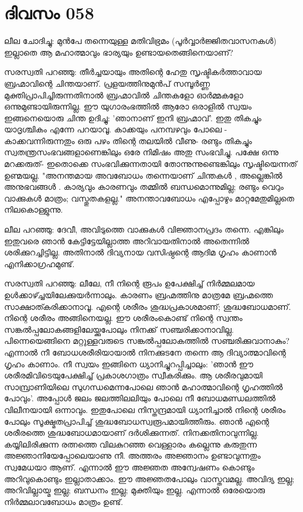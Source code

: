  
\section{ദിവസം 058}


ലീല ചോദിച്ചു: മുന്‍പേ തന്നെയുള്ള മതിവിഭ്രമം (പൂർവ്വാര്‍ജ്ജിതവാസനകൾ) ഇല്ലാതെ ആ മഹാത്മാവും ഭാര്യയും ഉണ്ടായതെങ്ങിനെയാണ്‌?

സരസ്വതി പറഞ്ഞു: തീര്‍ച്ചയായും അതിന്റെ ഹേതു സൃഷ്ടികര്‍ത്താവായ ബ്രഹ്മാവിന്റെ ചിന്തയാണ്‌. പ്രളയത്തിനുമുന്‍പ്‌ സമ്പൂര്‍ണ്ണ മുക്തിപ്രാപിച്ചിരുന്നതിനാല്‍ ബ്രഹ്മാവില്‍ ചിന്തകളോ ഓര്‍മ്മകളോ ഒന്നുമുണ്ടായിരുന്നില്ല. ഈ യുഗാരംഭത്തില്‍ ആരോ ഒരാളിൽ സ്വയം ഇങ്ങനെയൊരു ചിന്ത ഉദിച്ചു: 'ഞാനാണ്‌ ഇനി ബ്രഹ്മാവ്‌'. ഇതു തികച്ചും യാദൃശ്ചികം എന്നേ പറയാവൂ. കാക്കയും പനമ്പഴവും പോലെ - കാക്കവന്നിരുന്നതും ഒരു പഴം തിന്റെ തലയില്‍ വീണു- രണ്ടും തികച്ചും സ്വതന്ത്രസംഭവങ്ങളാണെങ്കിലും ഒരേ നിമിഷം അതു സംഭവിച്ചു. പക്ഷേ ഒന്നു മറക്കരുത്‌- ഇതൊക്കെ സംഭവിക്കുന്നതായി തോന്നുന്നുണ്ടെങ്കിലും സൃഷ്ടിയെന്നത്‌ ഉണ്മയല്ല. "അനന്തമായ അവബോധം തന്നെയാണ്‌ ചിന്തകള്‍ , അല്ലെങ്കില്‍ അനുഭവങ്ങള്‍ . കാര്യവും കാരണവും തമ്മില്‍ ബന്ധമൊന്നുമില്ല; രണ്ടും വെറും വാക്കുകള്‍ മാത്രം; വസ്തുതകളല്ല." അനന്താവബോധം എപ്പോഴും മാറ്റമേതുമില്ലതെ നിലകൊള്ളുന്നു.

ലീല പറഞ്ഞു: ദേവീ, അവിടുത്തെ വാക്കുകള്‍ വിജ്ഞാനപ്രദം തന്നെ. എങ്കിലും ഇതുവരെ ഞാന്‍ കേട്ടിട്ടേയില്ലാത്ത അറിവായതിനാല്‍ അതെന്നില്‍ ശരിക്കുറച്ചിട്ടില്ല. അതിനാല്‍ ദിവ്യനായ വസിഷ്ഠന്റെ ആദിമ ഗൃഹം കാണാന്‍ എനിക്കാഗ്രഹമുണ്ട്‌. 

സരസ്വതി പറഞ്ഞു: ലീലേ, നീ നിന്റെ രൂപം ഉപേക്ഷിച്ച്‌ നിര്‍മ്മലമായ ഉള്‍ക്കാഴ്ച്ചയിലേക്കുയര്‍ന്നാലും. കാരണം ബ്രഹ്മത്തിനു മാത്രമേ ബ്രഹ്മത്തെ സാക്ഷാത്കരിക്കാനാവൂ. എന്റെ ശരീരം ശുദ്ധപ്രകാശമാണ്‌; ശുദ്ധബോധമാണ്‌. നിന്റെ ശരീരം അങ്ങിനെയല്ല. ഈ ശരീരംകൊണ്ട്‌ നിന്റെ സ്വന്തം സങ്കല്‍പ്പലോകങ്ങളിലേയ്ക്കുപോലും നിനക്ക്‌ സഞ്ചരിക്കാനാവില്ല. പിന്നെയെങ്ങിനെ മറ്റുള്ളവരുടെ സങ്കല്‍പ്പലോകത്തില്‍ സഞ്ചരിക്കുവാനാകും? എന്നാല്‍ നീ ബോധശരീരിയായാല്‍ നിനക്കുടനേ തന്നെ ആ ദിവ്യാത്മാവിന്റെ ഗൃഹം കാണാം. നീ സ്വയം ഇങ്ങിനെ ധ്യാനിച്ചുറപ്പിച്ചാലും: 'ഞാന്‍ ഈ ശരീരമിവിടെയുപേക്ഷിച്ച്‌ പ്രകാശഗാത്രം സ്വീകരിക്കും. ആ ശരീരവുമായി സാമ്പ്രാണിയിലെ സുഗന്ധമെന്നപോലെ ഞാന്‍ മഹാത്മാവിന്റെ ഗൃഹത്തില്‍ പോവും'. അപ്പോള്‍ ജലം ജലത്തിലലിയും പോലെ നീ ബോധമണ്ഡലത്തില്‍ വിലീനയായി ഒന്നാവും. ഇതുപോലെ നിസ്തന്ദ്രമായി ധ്യാനിച്ചാല്‍ നിന്റെ ശരീരം പോലും സൂക്ഷ്മതപ്രാപിച്ച്‌ ശുദ്ധബോധസ്വരൂപമായിത്തീരും. ഞാന്‍ എന്റെ ശരീരത്തെ ശുദ്ധബോധമായാണ്‌ ദര്‍ശിക്കുന്നത്‌. നിനക്കതിനാവുന്നില്ല. കയ്യിലിരിക്കുന്ന രത്നത്തെ വിലകുറഞ്ഞ വെള്ളാരം കല്ലെന്നു കരുതുന്ന അജ്ഞാനിയേപ്പോലെയാണു നീ. അത്തരം അജ്ഞാനം ഉണ്ടാവുന്നതും സ്വമേധയാ ആണ്‌. എന്നാല്‍ ഈ അജ്ഞത അന്വേഷണം കൊണ്ടും അറിവുകൊണ്ടും ഇല്ലാതാക്കാം. ഈ അജ്ഞതപോലും വാസ്തവമല്ല. അവിദ്യ ഇല്ല; അറിവില്ലായ്മ ഇല്ല; ബന്ധനം ഇല്ല; മുക്തിയും ഇല്ല. എന്നാല്‍ ഒരേയൊരു നിര്‍മ്മലാവബോധം മാത്രം ഉണ്ട്‌.
